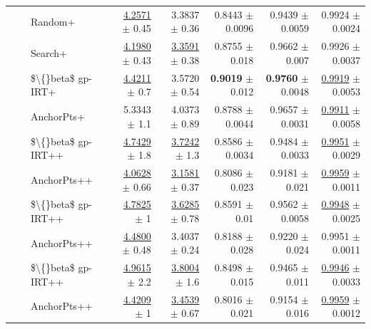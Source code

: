\begin{longtable}{llp{}rrrrr}
 &  & Random+ & \underline{4.2571} {\scriptsize $\pm$ 0.45} & 3.3837 {\scriptsize $\pm$ 0.36} & 0.8443 {\scriptsize $\pm$ 0.0096} & 0.9439 {\scriptsize $\pm$ 0.0059} & 0.9924 {\scriptsize $\pm$ 0.0024} \\
 &  & Search+ & \underline{4.1980} {\scriptsize $\pm$ 0.43} & \underline{3.3591} {\scriptsize $\pm$ 0.38} & 0.8755 {\scriptsize $\pm$ 0.018} & 0.9662 {\scriptsize $\pm$ 0.007} & 0.9926 {\scriptsize $\pm$ 0.0037} \\
 &  & \$\textbackslash\{\}beta\$ gp-IRT+ & \underline{4.4211} {\scriptsize $\pm$ 0.7} & 3.5720 {\scriptsize $\pm$ 0.54} & \textbf{0.9019} {\scriptsize $\pm$ 0.012} & \textbf{0.9760} {\scriptsize $\pm$ 0.0048} & \underline{0.9919} {\scriptsize $\pm$ 0.0053} \\
 &  & AnchorPts+ & 5.3343 {\scriptsize $\pm$ 1.1} & 4.0373 {\scriptsize $\pm$ 0.89} & 0.8788 {\scriptsize $\pm$ 0.0044} & 0.9657 {\scriptsize $\pm$ 0.0031} & \underline{0.9911} {\scriptsize $\pm$ 0.0058} \\
 &  & \$\textbackslash\{\}beta\$ gp-IRT++ & \underline{4.7429} {\scriptsize $\pm$ 1.8} & \underline{3.7242} {\scriptsize $\pm$ 1.3} & 0.8586 {\scriptsize $\pm$ 0.0034} & 0.9484 {\scriptsize $\pm$ 0.0033} & \underline{0.9951} {\scriptsize $\pm$ 0.0029} \\
 &  & AnchorPts++ & \underline{4.0628} {\scriptsize $\pm$ 0.66} & \underline{3.1581} {\scriptsize $\pm$ 0.37} & 0.8086 {\scriptsize $\pm$ 0.023} & 0.9181 {\scriptsize $\pm$ 0.021} & \underline{0.9959} {\scriptsize $\pm$ 0.0011} \\
 &  & \$\textbackslash\{\}beta\$ gp-IRT++ & \underline{4.7825} {\scriptsize $\pm$ 1} & \underline{3.6285} {\scriptsize $\pm$ 0.78} & 0.8591 {\scriptsize $\pm$ 0.01} & 0.9562 {\scriptsize $\pm$ 0.0058} & \underline{0.9948} {\scriptsize $\pm$ 0.0025} \\
 &  & AnchorPts++ & \underline{4.4800} {\scriptsize $\pm$ 0.48} & 3.4037 {\scriptsize $\pm$ 0.24} & 0.8188 {\scriptsize $\pm$ 0.028} & 0.9220 {\scriptsize $\pm$ 0.024} & 0.9951 {\scriptsize $\pm$ 0.0011} \\
 &  & \$\textbackslash\{\}beta\$ gp-IRT++ & \underline{4.9615} {\scriptsize $\pm$ 2.2} & \underline{3.8004} {\scriptsize $\pm$ 1.6} & 0.8498 {\scriptsize $\pm$ 0.015} & 0.9465 {\scriptsize $\pm$ 0.011} & \underline{0.9946} {\scriptsize $\pm$ 0.0033} \\
 &  & AnchorPts++ & \underline{4.4209} {\scriptsize $\pm$ 1} & \underline{3.4539} {\scriptsize $\pm$ 0.67} & 0.8016 {\scriptsize $\pm$ 0.021} & 0.9154 {\scriptsize $\pm$ 0.016} & \underline{0.9959} {\scriptsize $\pm$ 0.0012} \\

\end{longtable}
